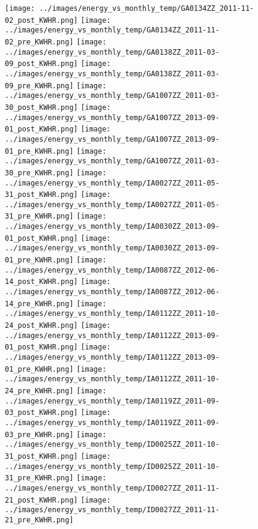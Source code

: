 \clearpage
\begin{figure}
\centering
\texttt{[image: ../images/energy\_vs\_monthly\_temp/GA0134ZZ\_2011-11-02\_post\_KWHR.png]}
\texttt{[image: ../images/energy\_vs\_monthly\_temp/GA0134ZZ\_2011-11-02\_pre\_KWHR.png]}
\texttt{[image: ../images/energy\_vs\_monthly\_temp/GA0138ZZ\_2011-03-09\_post\_KWHR.png]}
\texttt{[image: ../images/energy\_vs\_monthly\_temp/GA0138ZZ\_2011-03-09\_pre\_KWHR.png]}
\texttt{[image: ../images/energy\_vs\_monthly\_temp/GA1007ZZ\_2011-03-30\_post\_KWHR.png]}
\texttt{[image: ../images/energy\_vs\_monthly\_temp/GA1007ZZ\_2013-09-01\_post\_KWHR.png]}
\texttt{[image: ../images/energy\_vs\_monthly\_temp/GA1007ZZ\_2013-09-01\_pre\_KWHR.png]}
\texttt{[image: ../images/energy\_vs\_monthly\_temp/GA1007ZZ\_2011-03-30\_pre\_KWHR.png]}
\texttt{[image: ../images/energy\_vs\_monthly\_temp/IA0027ZZ\_2011-05-31\_post\_KWHR.png]}
\texttt{[image: ../images/energy\_vs\_monthly\_temp/IA0027ZZ\_2011-05-31\_pre\_KWHR.png]}
\texttt{[image: ../images/energy\_vs\_monthly\_temp/IA0030ZZ\_2013-09-01\_post\_KWHR.png]}
\texttt{[image: ../images/energy\_vs\_monthly\_temp/IA0030ZZ\_2013-09-01\_pre\_KWHR.png]}
\texttt{[image: ../images/energy\_vs\_monthly\_temp/IA0087ZZ\_2012-06-14\_post\_KWHR.png]}
\texttt{[image: ../images/energy\_vs\_monthly\_temp/IA0087ZZ\_2012-06-14\_pre\_KWHR.png]}
\texttt{[image: ../images/energy\_vs\_monthly\_temp/IA0112ZZ\_2011-10-24\_post\_KWHR.png]}
\texttt{[image: ../images/energy\_vs\_monthly\_temp/IA0112ZZ\_2013-09-01\_post\_KWHR.png]}
\texttt{[image: ../images/energy\_vs\_monthly\_temp/IA0112ZZ\_2013-09-01\_pre\_KWHR.png]}
\texttt{[image: ../images/energy\_vs\_monthly\_temp/IA0112ZZ\_2011-10-24\_pre\_KWHR.png]}
\texttt{[image: ../images/energy\_vs\_monthly\_temp/IA0119ZZ\_2011-09-03\_post\_KWHR.png]}
\texttt{[image: ../images/energy\_vs\_monthly\_temp/IA0119ZZ\_2011-09-03\_pre\_KWHR.png]}
\texttt{[image: ../images/energy\_vs\_monthly\_temp/ID0025ZZ\_2011-10-31\_post\_KWHR.png]}
\texttt{[image: ../images/energy\_vs\_monthly\_temp/ID0025ZZ\_2011-10-31\_pre\_KWHR.png]}
\texttt{[image: ../images/energy\_vs\_monthly\_temp/ID0027ZZ\_2011-11-21\_post\_KWHR.png]}
\texttt{[image: ../images/energy\_vs\_monthly\_temp/ID0027ZZ\_2011-11-21\_pre\_KWHR.png]}
\end{figure}
